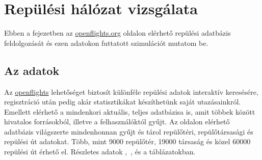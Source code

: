 \chapter{Repülési hálózat vizsgálata}\label{test}
Ebben a fejezetben az \href{http://openflights.org/}{openflights.org} oldalon elérhető repülési adatbázis feldolgozását és ezen adatokon futtatott szimulációt mutatom be.

  \section{Az adatok}
  Az \href{http://openflights.org/}{openflights} lehetőséget biztosít különféle repülési adatok interaktív keresésére, regisztráció után pedig akár statisztikákat készíthetünk saját utazásainkról. Emellett elérhető a mindenkori aktuális, teljes adatbázisa is, amit többek között hivatalos forrásokból, illetve a felhasználóktól gyűjt.
  Az oldalon elérhető adatbázis világszerte mindenhonnan gyűjt és tárol repülőtéri, repülőtársasági és repülési út adatokat. Több, mint 9000 repülőtér, 19000 társaság és közel 60000 repülési út érhető el. Részletes adatok ,~, és a  táblázatokban.

